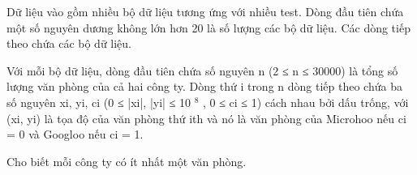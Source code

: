 Dữ liệu vào gồm nhiều bộ dữ liệu tương ứng với nhiều test. Dòng đầu tiên chứa một số nguyên dương không lớn hơn 20 là số lượng các bộ dữ liệu. Các dòng tiếp theo chứa các bộ dữ liệu.  

   Với mỗi bộ dữ liệu, dòng đầu tiên chứa số nguyên n (2 ≤ n ≤ 30000) là tổng số lượng văn phòng của cả hai công ty. Dòng thứ i trong n dòng tiếp theo chứa ba số nguyên xi, yi, ci (0 ≤ |xi|, |yi| ≤ 10   $^    8   $   , 0 ≤ ci ≤ 1) cách nhau bởi dấu trống, với (xi, yi) là tọa độ của văn phòng thứ ith và nó là văn phòng của Microhoo nếu ci = 0 và Googloo nếu ci = 1.  

   Cho biết mỗi công ty có ít nhất một văn phòng.